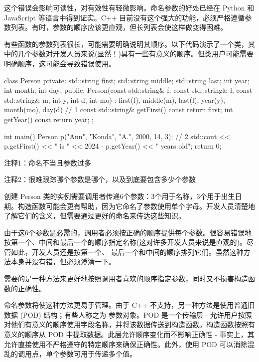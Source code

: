 这个错误会影响可读性，对有效性有轻微影响。命名参数的好处已经在 Python 和 JavaScript 等语言中得到证实。C++ 目前没有这个强大的功能，必须严格遵循参数列表。有时，参数的顺序应该更直观，但长列表会使这样做变得困难。


有些函数的参数列表很长，可能需要明确说明其顺序。以下代码演示了一个类，其中的几个参数对开发人员来说(显然！)具有一些有意义的顺序。但类用户可能需要明确顺序，这可能会导致错误使用。


\begin{cpp}
class Person {
private:
  std::string first;
  std::string middle;
  std::string last;
  int year;
  int month;
  int day;
public:
  Person(const std::string& f, const std::string& l, const std::string& m,
  int y, int d, int mo) :
    first(f), middle(m), last(l), year(y), month(mo), day(d) {} // 1
  const std::string& getFirst() const { return first; }
  int getYear() const { return year; }
};

int main() {
  Person p("Ann", "Konda", "A.", 2000, 14, 3); // 2
  std::cout << p.getFirst() << " is " << 2024 - p.getYear() << " years old\n";
  return 0;
}
\end{cpp}

{\footnotesize
注释1：命名不当且参数过多

注释2：很难跟踪哪个参数是哪个，以及到底要包含多少个参数
}


创建 Person 类的实例需要调用者传递6个参数：3个用于名称，3个用于出生日期。构造函数可能会更有帮助，因为它命名了参数使用单个字母。开发人员清楚地了解它们的含义，但需要通过更好的命名来传达这些知识。

由于这6个参数是必需的，调用者必须按正确的顺序提供每个参数。很容易错误地按第一个、中间和最后一个的顺序指定名称(这对许多开发人员来说是直观的)。尽管如此，开发人员还是按第一个、 最后一个和中间的顺序排列它们。虽然这种方法本身并没有错，但必须澄清一下。

需要的是一种方法来更好地按照调用者喜欢的顺序指定参数，同时又不损害构造函数的正确性。


命名参数将使这种方法更易于管理。由于 C++ 不支持，另一种方法是使用普通旧数据 (POD) 结构；有些人称之为 参数对象。POD 是一个传输层 - 允许用户按照对他们有意义的顺序使用字段名称，并将该数据传送到构造函数。构造函数按照有意义的顺序从 POD 中提取数据。此层允许顺序变化而不影响正确性 - 事实上，其允许直接使用不严格遵守的特定顺序来确保正确性。此外，使用 POD 可以消除混乱的调用点，单个参数可用于传递多个值。

